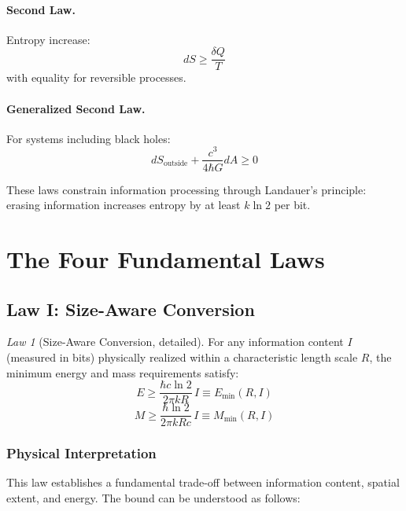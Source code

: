 \documentclass[11pt,a4paper]{article}
\theoremstyle{plain}
\theoremstyle{definition}
\theoremstyle{remark}
\newtheorem{law}{Law}
\begin{document}
\paragraph{Second Law.} Entropy increase:
\begin{equation}
dS \geq \frac{\delta Q}{T}
\end{equation}
with equality for reversible processes.

\paragraph{Generalized Second Law.} For systems including black holes:
\begin{equation}
dS_{\text{outside}} + \frac{c^3}{4\hbar G}dA \geq 0
\end{equation}

These laws constrain information processing through Landauer's principle: erasing information increases entropy by at least $k\ln 2$ per bit.

\section{The Four Fundamental Laws}
\label{sec:laws}

\subsection{Law I: Size-Aware Conversion}

\begin{law}[Size-Aware Conversion, detailed]
For any information content $I$ (measured in bits) physically realized within a characteristic length scale $R$, the minimum energy and mass requirements satisfy:
\begin{equation}
E \geq \frac{\hbar c\ln 2}{2\pi k R}\,I \equiv E_{\min}(R,I)
\label{eq:law1_detailed}
\end{equation}
\begin{equation}
M \geq \frac{\hbar\ln 2}{2\pi k R c}\,I \equiv M_{\min}(R,I)
\label{eq:mass_bound}
\end{equation}
\end{law}

\subsubsection{Physical Interpretation}

This law establishes a fundamental trade-off between information content, spatial extent, and energy. The bound can be understood as follows:
\end{document}
